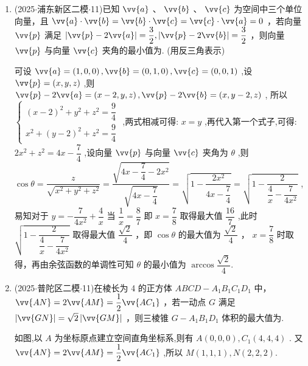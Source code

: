 \begin{enumerate}
    \item (2025$\cdot$浦东新区二模$\cdot$11)已知 $\vv{a}$ 、 $\vv{b}$ 、 $\vv{c}$ 为空间中三个单位向量，且 $\vv{a} \cdot  \vv{b} = \vv{b} \cdot  \vv{c} = \vv{c} \cdot  \vv{a} = 0$ ，若向量 $\vv{p}$ 满足 $\left| {\vv{p} - 2\vv{a}}\right|  = \dfrac{3}{2},\left| {\vv{p} - 2\vv{b}}\right|  = \dfrac{3}{2}$ ，则向量 $\vv{p}$ 与向量 $\vv{c}$ 夹角的最小值为. (用反三角表示)
    \begin{jieda}
        可设 $\vv{a} = \left( {1,0,0}\right) ,\vv{b} = \left( {0,1,0}\right) ,\vv{c} = \left( {0,0,1}\right)$ ,设 $\vv{p} =  \left( {x,y,z}\right)$ ,则 $\vv{p} - 2\vv{a} = \left( {x - 2,y,z}\right) ,\vv{p} - 2\vv{b} = \left( {x,y - 2,z}\right)$ , 所以 $\left\{  \begin{array}{l} {\left( x - 2\right) }^{2} + {y}^{2} + {z}^{2} = \dfrac{9}{4} \\  {x}^{2} + {\left( y - 2\right) }^{2} + {z}^{2} = \dfrac{9}{4} \end{array}\right.$ ,两式相减可得: $x = y$ ,再代入第一个式子,可得: $2{x}^{2} + {z}^{2} = {4x} - \dfrac{7}{4}$ ,设向量 $\vv{p}$ 与向量 $\vv{c}$ 夹角为 $\theta$ ,则 $\cos \theta  = \dfrac{z}{\sqrt{{x}^{2} + {y}^{2} + {z}^{2}}} = \dfrac{\sqrt{{4x} - \dfrac{7}{4} - 2{x}^{2}}}{\sqrt{{4x} - \dfrac{7}{4}}} =  \sqrt{1 - \dfrac{2{x}^{2}}{{4x} - \dfrac{7}{4}}} = \sqrt{1 - \dfrac{2}{\dfrac{4}{x} - \dfrac{7}{4{x}^{2}}}}$ ,易知对于 $y =  - \dfrac{7}{4{x}^{2}} + \dfrac{4}{x}$ 当 $\dfrac{1}{x} = \dfrac{8}{7}$ 即 $x = \dfrac{7}{8}$ 取得最大值 $\dfrac{16}{7}$ ,此时 $\sqrt{1 - \dfrac{2}{\dfrac{4}{x} - \dfrac{7}{4{x}^{2}}}}$ 取得最大值 $\dfrac{\sqrt{2}}{4}$ ，即 $\cos \theta$ 的最大值为 $\dfrac{\sqrt{2}}{4}$ ， $x = \dfrac{7}{8}$ 时取得，再由余弦函数的单调性可知 $\theta$ 的最小值为 $\arccos \dfrac{\sqrt{2}}{4}$.
    \end{jieda}
    \item (2025$\cdot$普陀区二模$\cdot$11)在棱长为 4 的正方体 ${ABCD} - {A}_{1}{B}_{1}{C}_{1}{D}_{1}$ 中， $\vv{AN} = 2\vv{AM} = \dfrac{1}{2}\vv{A{C}_{1}}$ ，若一动点 $G$ 满足 $\left| \vv{GN}\right|  = \sqrt{2}\left| \vv{GM}\right|$ ，则三棱锥 $G - {A}_{1}{B}_{1}{D}_{1}$ 体积的最大值为.
    \begin{jieda}
        如图,以 $A$ 为坐标原点建立空间直角坐标系,则有 $A\left( {0,0,0}\right) ,{C}_{1}\left( {4,4,4}\right)$ . 又 $\vv{AN} = 2\vv{AM} = \dfrac{1}{2}\vv{A{C}_{1}}$ ,所以 $M(1,1,1),N\left( {2,2,2}\right)$.
        

\end{jieda}
\end{enumerate}
